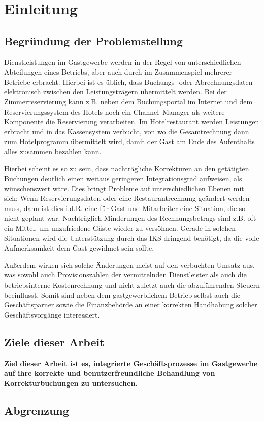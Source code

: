 \section{Einleitung} %
\label{sec:einleitung}

\subsection{Begründung der Problemstellung} %
\label{sub:begrundung_der_problemstellung}
Dienstleistungen im Gastgewerbe werden in der Regel von unterschiedlichen Abteilungen eines Betriebs, aber auch durch im Zusammenspiel mehrerer Betriebe erbracht. Hierbei ist es üblich, dass Buchungs- oder Abrechnungsdaten elektronisch zwischen den Leistungsträgern übermittelt werden. Bei der Zimmerreservierung kann z.B. neben dem Buchungsportal im Internet und dem Reservierungssystem des Hotels noch ein Channel–Manager als weitere Komponente die Reservierung verarbeiten. Im Hotelrestaurant werden Leistungen erbracht und in das Kassensystem verbucht, von wo die Gesamtrechnung dann zum Hotelprogramm übermittelt wird, damit der Gast am Ende des Aufenthalts alles zusammen bezahlen kann.

Hierbei scheint es so zu sein, dass nachträgliche Korrekturen an den getätigten Buchungen deutlich einen weitaus geringeren Integrationsgrad aufweisen, als wünschenswert wäre. Dies bringt Probleme auf unterschiedlichen Ebenen mit sich: Wenn Reservierungsdaten oder eine Restaurantrechnung geändert werden muss, dann ist dies i.d.R. eine für Gast und Mitarbeiter eine Situation, die so nicht geplant war. Nachträglich Minderungen des Rechnungsbetrags sind z.B. oft ein Mittel, um unzufriedene Gäste wieder zu versöhnen. Gerade in solchen Situationen wird die Unterstützung durch das \ac{IKS} dringend benötigt, da die volle Aufmerksamkeit dem Gast gewidmet sein sollte.

Außerdem wirken sich solche Änderungen meist auf den verbuchten Umsatz aus, was sowohl  auch Provisionszahlen der vermittelnden Dienstleister als auch die betriebsinterne Kostenrechnung und nicht zuletzt auch die abzuführenden Steuern beeinflusst. Somit sind neben dem gastgewerblichem Betrieb selbst auch die Geschäftsparner sowie die Finanzbehörde an einer korrekten Handhabung solcher Geschäftsvorgänge interessiert.

\subsection{Ziele dieser Arbeit} %
\label{sub:ziele_dieser_arbeit}
\textbf{Ziel dieser Arbeit ist es, integrierte Geschäftsprozesse im Gastgewerbe auf ihre korrekte und benutzerfreundliche Behandlung von Korrekturbuchungen zu untersuchen.}



\subsection{Abgrenzung} %
\label{sub:abgrenzung}




